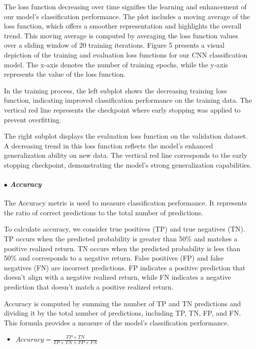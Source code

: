 \documentclass{article}
\begin{document}
The loss function decreasing over time signifies the learning and enhancement of our model's classification performance. The plot includes a moving average of the loss function, which offers a smoother representation and highlights the overall trend. This moving average is computed by averaging the loss function values over a sliding window of 20 training iterations. Figure 5 presents a visual depiction of the training and evaluation loss functions for our CNN classification model. The x-axis denotes the number of training epochs, while the y-axis represents the value of the loss function.

In the training process, the left subplot shows the decreasing training loss function, indicating improved classification performance on the training data. The vertical red line represents the checkpoint where early stopping was applied to prevent overfitting.

The right subplot displays the evaluation loss function on the validation dataset. A decreasing trend in this loss function reflects the model's enhanced generalization ability on new data. The vertical red line corresponds to the early stopping checkpoint, demonstrating the model's strong generalization capabilities.

\paragraph{$\bullet$ \emph {Accuracy}}
The Accuracy metric is used to measure classification performance. It represents the ratio of correct predictions to the total number of predictions.

To calculate accuracy, we consider true positives (TP) and true negatives (TN). TP occurs when the predicted probability is greater than 50\% and matches a positive realized return. TN occurs when the predicted probability is less than 50\% and corresponds to a negative return. False positives (FP) and false negatives (FN) are incorrect predictions. FP indicates a positive prediction that doesn't align with a negative realized return, while FN indicates a negative prediction that doesn't match a positive realized return.

Accuracy is computed by summing the number of TP and TN predictions and dividing it by the total number of predictions, including TP, TN, FP, and FN. This formula provides a measure of the model's classification performance.

\begin{itemize}
    \setlength\itemindent{2em}
    \item[] \emph{$Accuracy = \frac{TP + TN}{TP + TN + FP + FN}$}
\end{itemize}
\end{document}
